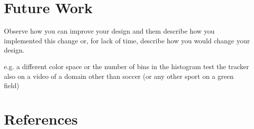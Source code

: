 \documentclass[a4paper,11pt]{article}
\begin{document}
\section{Future Work} \label{sec:fut}
Observe how you can improve your design and them describe how you implemented this change or, for lack of time, describe how you would change your design. 

e.g. a different color space or the number of bins in the histogram
test the tracker also on a video of a domain other than soccer (or any other sport on a green field)





\section{References} 


\renewcommand\bibname{References}


\end{document}
